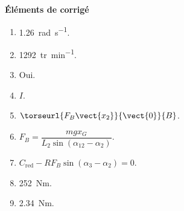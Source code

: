 \ifprof
\else

\footnotesize
%
\ifcolle
\else
\ifnormal
\vspace{.5cm}
\noindent \textbf{Éléments de corrigé}
\vspace{-.5cm}
\begin{multicols}{2}
\begin{enumerate}
\item \SI{1,26}{rad.s^{-1}}.
\item \SI{1292}{tr.min^{-1}}.
\item Oui.
\item $I$.
\item  $\torseurl{ F_B\vect{x_{2}}}{\vect{0}}{B}$.
\item $ F_B    = \dfrac{mgx_G}{L_2  \sin  \left(\alpha_{12}-\alpha_2\right)} $.
\item $C_{\text{red}}-RF_B \sin \left( \alpha_3 - \alpha_2\right) = 0$.
\item \SI{252}{Nm}.
\item \SI{2,34}{Nm}.
\end{enumerate}
\end{multicols}
\else
\fi
\fi
\fi

\normalsize

